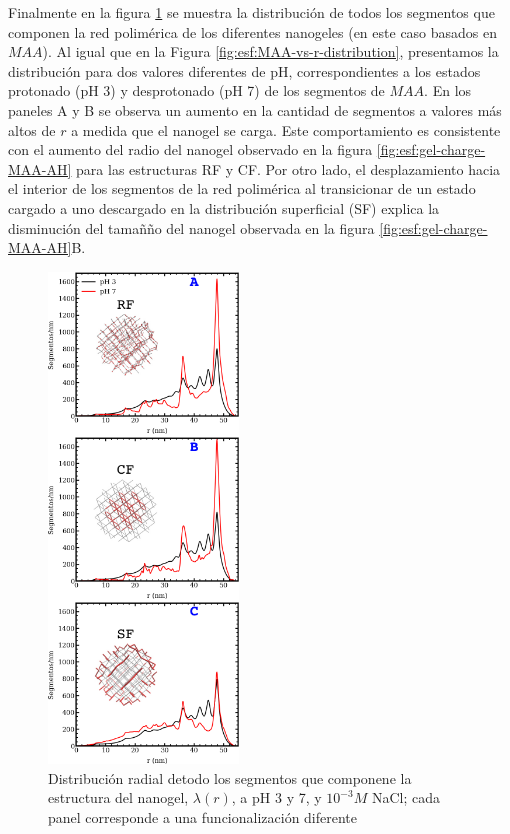 Finalmente en la figura \ref{fig:esf:allr-distribution} se muestra la distribuci\'on de todos los segmentos que componen la red polim\'erica de los diferentes nanogeles (en este caso basados en $MAA$). Al igual que en la Figura \ref{fig:esf:MAA-vs-r-distribution}, presentamos la distribuci\'on para dos valores diferentes de pH, correspondientes a los estados protonado (pH 3) y desprotonado (pH 7) de los segmentos de $MAA$. En los paneles A y B se observa un aumento en la cantidad de segmentos a valores m\'as altos de $r$ a medida que el nanogel se carga. Este comportamiento es consistente con el aumento del radio del nanogel observado en la figura \ref{fig:esf:gel-charge-MAA-AH} para las estructuras RF y CF. Por otro lado, el desplazamiento hacia el interior de los segmentos de la red polim\'erica al transicionar de un estado cargado a uno descargado en la distribuci\'on superficial (SF) explica la disminuci\'on del tamañ\~no del nanogel observada en la figura \ref{fig:esf:gel-charge-MAA-AH}B.

\begin{figure}[!htb]
	\centering
	\includegraphics[width=0.45\textwidth]{Figures/graphs-gel2/allseg_SI.pdf}
	\caption{Distribuci\'on radial detodo los segmentos que componene la estructura del nanogel, $\lambda(r)$, a pH 3 y 7, y $10^{-3}M$ NaCl; cada panel corresponde a una funcionalizaci\'on  diferente}
	\label{fig:esf:allr-distribution}
\end{figure}




